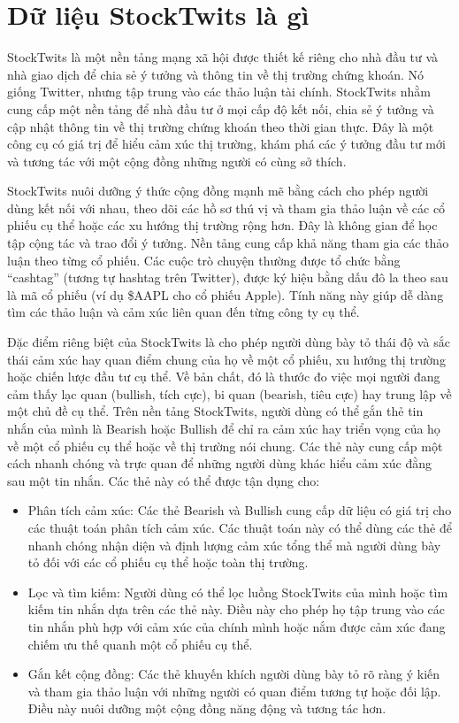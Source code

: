 \section{Dữ liệu StockTwits là gì}

StockTwits là một nền tảng mạng xã hội được thiết kế riêng cho nhà đầu tư và nhà giao dịch để chia sẻ ý tưởng và thông tin về thị trường chứng khoán. Nó giống Twitter, nhưng tập trung vào các thảo luận tài chính. StockTwits nhằm cung cấp một nền tảng để nhà đầu tư ở mọi cấp độ kết nối, chia sẻ ý tưởng và cập nhật thông tin về thị trường chứng khoán theo thời gian thực. Đây là một công cụ có giá trị để hiểu cảm xúc thị trường, khám phá các ý tưởng đầu tư mới và tương tác với một cộng đồng những người có cùng sở thích.

StockTwits nuôi dưỡng ý thức cộng đồng mạnh mẽ bằng cách cho phép người dùng kết nối với nhau, theo dõi các hồ sơ thú vị và tham gia thảo luận về các cổ phiếu cụ thể hoặc các xu hướng thị trường rộng hơn. Đây là không gian để học tập cộng tác và trao đổi ý tưởng. Nền tảng cung cấp khả năng tham gia các thảo luận theo từng cổ phiếu. Các cuộc trò chuyện thường được tổ chức bằng ``cashtag'' (tương tự hashtag trên Twitter), được ký hiệu bằng dấu đô la theo sau là mã cổ phiếu (ví dụ \$AAPL cho cổ phiếu Apple). Tính năng này giúp dễ dàng tìm các thảo luận và cảm xúc liên quan đến từng công ty cụ thể.

Đặc điểm riêng biệt của StockTwits là cho phép người dùng bày tỏ thái độ và sắc thái cảm xúc hay quan điểm chung của họ về một cổ phiếu, xu hướng thị trường hoặc chiến lược đầu tư cụ thể. Về bản chất, đó là thước đo việc mọi người đang cảm thấy lạc quan (bullish, tích cực), bi quan (bearish, tiêu cực) hay trung lập về một chủ đề cụ thể. Trên nền tảng StockTwits, người dùng có thể gắn thẻ tin nhắn của mình là Bearish hoặc Bullish để chỉ ra cảm xúc hay triển vọng của họ về một cổ phiếu cụ thể hoặc về thị trường nói chung. Các thẻ này cung cấp một cách nhanh chóng và trực quan để những người dùng khác hiểu cảm xúc đằng sau một tin nhắn. Các thẻ này có thể được tận dụng cho:

\begin{itemize}
  \item Phân tích cảm xúc: Các thẻ Bearish và Bullish cung cấp dữ liệu có giá trị cho các thuật toán phân tích cảm xúc. Các thuật toán này có thể dùng các thẻ để nhanh chóng nhận diện và định lượng cảm xúc tổng thể mà người dùng bày tỏ đối với các cổ phiếu cụ thể hoặc toàn thị trường.
  \item Lọc và tìm kiếm: Người dùng có thể lọc luồng StockTwits của mình hoặc tìm kiếm tin nhắn dựa trên các thẻ này. Điều này cho phép họ tập trung vào các tin nhắn phù hợp với cảm xúc của chính mình hoặc nắm được cảm xúc đang chiếm ưu thế quanh một cổ phiếu cụ thể.
  \item Gắn kết cộng đồng: Các thẻ khuyến khích người dùng bày tỏ rõ ràng ý kiến và tham gia thảo luận với những người có quan điểm tương tự hoặc đối lập. Điều này nuôi dưỡng một cộng đồng năng động và tương tác hơn.
\end{itemize}

